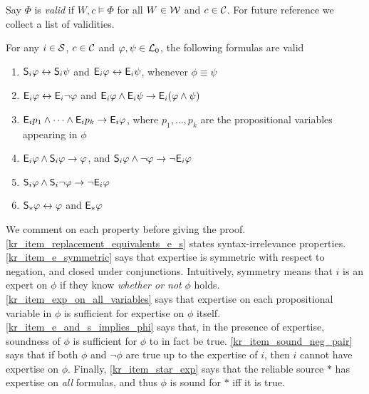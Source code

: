 Say $\Phi$ is \emph{valid} if $W, c \models \Phi$ for all $W \in \mathcal{W}$ and $c \in \mathcal{C}$.
For future reference we collect a list of validities.\footnotemark{}


\begin{proposition}
\label{kr_prop_validities}
For any $i \in \mathcal{S}$, $c \in \mathcal{C}$ and $\varphi, \psi \in \mathcal{L}{}_0$, the following
formulas are valid
\begin{enumerate}
    \item \label{kr_item_replacement_equivalents_e_s}
          $\mathsf{S}_i\varphi \leftrightarrow \mathsf{S}_i\psi$ and $\mathsf{E}_i\varphi \leftrightarrow
          \mathsf{E}_i\psi$, whenever $\phi \equiv \psi$
    \item \label{kr_item_e_symmetric}
          $\mathsf{E}_i\varphi \leftrightarrow \mathsf{E}_i\neg\varphi$ and $\mathsf{E}_i\varphi \land
          \mathsf{E}_i\psi \to \mathsf{E}_i(\varphi \land \psi)$
    \item \label{kr_item_exp_on_all_variables} $\mathsf{E}_i{p_1} \land \cdots \land
          \mathsf{E}_i{p_k} \to \mathsf{E}_i\varphi$, where $p_1, \ldots, p_k$ are the
          propositional variables appearing in $\phi$
    \item \label{kr_item_e_and_s_implies_phi}
          $\mathsf{E}_i\varphi \land \mathsf{S}_i\varphi \to \varphi$, and
          $\mathsf{S}_i\varphi \land \neg \varphi \to \neg \mathsf{E}_i\varphi$
    \item \label{kr_item_sound_neg_pair}
          $\mathsf{S}_i\varphi \land \mathsf{S}_i{\neg \varphi} \to \neg \mathsf{E}_i\varphi$
    \item \label{kr_item_star_exp}
          $\mathsf{S}_\ast{\varphi} \leftrightarrow \varphi$ and $\mathsf{E}_\ast\varphi$
\end{enumerate}
\end{proposition}

We comment on each property before giving the proof.
\cref{kr_item_replacement_equivalents_e_s} states syntax-irrelevance
properties.
%
\cref{kr_item_e_symmetric} says that expertise is symmetric with respect to
negation, and closed under conjunctions. Intuitively, symmetry means that $i$
is an expert on $\phi$ if they know \emph{whether or not} $\phi$ holds.
%
\cref{kr_item_exp_on_all_variables} says that expertise on each
propositional variable in $\phi$ is sufficient for expertise on $\phi$ itself.
%
\cref{kr_item_e_and_s_implies_phi} says that, in the presence of expertise,
soundness of $\phi$ is sufficient for $\phi$ to in fact be true.
%
\cref{kr_item_sound_neg_pair} says that if both $\phi$ and $\neg\phi$ are
true up to the expertise of $i$, then $i$ cannot have expertise on $\phi$.
%
Finally, \cref{kr_item_star_exp} says that the reliable source $\ast$ has
expertise on \emph{all} formulas, and thus $\phi$ is sound for $\ast$ iff it is
true.

